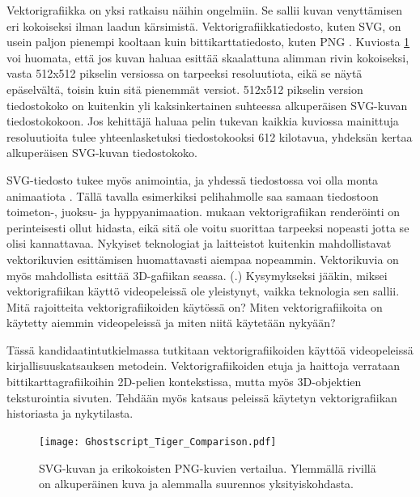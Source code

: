 \documentclass[utf8,bachelor]{gradu3}
\newcommand{\parencitedot}[1]{(\cite{#1}.)}
\begin{document}
Vektorigrafiikka on yksi ratkaisu näihin ongelmiin. Se sallii kuvan venyttämisen eri kokoiseksi ilman laadun kärsimistä. Vektorigrafiikkatiedosto, kuten SVG, on usein paljon pienempi kooltaan kuin bittikarttatiedosto, kuten PNG \parencites{RefWorks:doc:5bdc5224e4b05afcfde5b159}{RefWorks:doc:5bdc5292e4b05afcfde5b171}. Kuviosta \ref{tiikeri} voi huomata, että jos kuvan haluaa esittää skaalattuna alimman rivin kokoiseksi, vasta 512x512 pikselin versiossa on tarpeeksi resoluutiota, eikä se näytä epäselvältä, toisin kuin sitä pienemmät versiot. 512x512 pikselin version tiedostokoko on kuitenkin yli kaksinkertainen suhteessa alkuperäisen SVG-kuvan tiedostokokoon. Jos kehittäjä haluaa pelin tukevan kaikkia kuviossa mainittuja resoluutioita tulee yhteenlasketuksi tiedostokooksi 612 kilotavua, yhdeksän kertaa alkuperäisen SVG-kuvan tiedostokoko.

SVG-tiedosto tukee myös animointia, ja yhdessä tiedostossa voi olla monta animaatiota \parencite{RefWorks:doc:5bd74719e4b0e42e08f6333b}. Tällä tavalla esimerkiksi pelihahmolle saa samaan tiedostoon toimeton-, juoksu- ja hyppyanimaation. \textcite{RefWorks:doc:5bc4a5cce4b080e02f7eff1b} mukaan vektorigrafiikan renderöinti on perinteisesti ollut hidasta, eikä sitä ole voitu suorittaa tarpeeksi nopeasti jotta se olisi kannattavaa. Nykyiset teknologiat ja laitteistot kuitenkin mahdollistavat vektorikuvien esittämisen huomattavasti aiempaa nopeammin. Vektorikuvia on myös mahdollista esittää 3D-gafiikan seassa. \parencitedot{RefWorks:doc:5bc4a5cce4b080e02f7eff1b} Kysymykseksi jääkin, miksei vektorigrafiikan käyttö videopeleissä ole yleistynyt, vaikka teknologia sen sallii. Mitä rajoitteita vektorigrafiikoiden käytössä on? Miten vektorigrafiikoita on käytetty aiemmin videopeleissä ja miten niitä käytetään nykyään?

Tässä kandidaatintutkielmassa tutkitaan vektorigrafiikoiden käyttöä videopeleissä kirjallisuuskatsauksen metodein. Vektorigrafiikoiden etuja ja haittoja verrataan bittikarttagrafiikoihin 2D-pelien kontekstissa, mutta myös 3D-objektien teksturointia sivuten. Tehdään myös katsaus peleissä käytetyn vektorigrafiikan historiasta ja nykytilasta.

\begin{figure}[!b]
	\centering
	\texttt{[image: Ghostscript\_Tiger\_Comparison.pdf]}
    \caption{SVG-kuvan ja erikokoisten PNG-kuvien vertailua. Ylemmällä rivillä on alkuperäinen kuva ja alemmalla suurennos yksityiskohdasta.}\label{tiikeri}
\end{figure}
\end{document}
